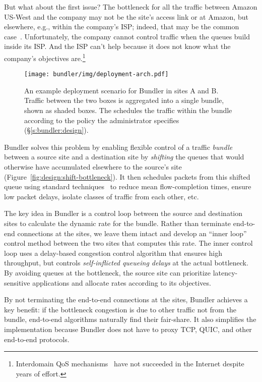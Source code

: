 But what about the first issue? The bottleneck for all the traffic between Amazon US-West and the company may not be the site's access link or at Amazon, but elsewhere, e.g., within the company's ISP; indeed, that may be the common case~\cite{inferring-interdomain-congestion, isp-throttle-1, isp-throttle-2, isp-throttle-3}. Unfortunately, the company cannot control traffic when the queues build inside its ISP. And the ISP can't help because it does not know what the company's objectives are.\footnote{Interdomain QoS mechanisms~\cite{braden1997resource, wroclawski1997use} have not succeeded in the Internet despite years of effort.}

\begin{figure}
    \centering
    \texttt{[image: bundler/img/deployment-arch.pdf]}
    \caption{An example deployment scenario for Bundler in sites A and B.
    Traffic between the two boxes is aggregated into a single bundle, shown as shaded boxes. The \inbox schedules the traffic within the bundle according to the policy the administrator specifies (\S\ref{s:bundler:design}).
    }
    \label{fig:deploy:arch}
\end{figure}


Bundler solves this problem by enabling flexible control of a traffic {\em bundle} between a source site and a destination site by {\em shifting} the queues that would otherwise have accumulated elsewhere to the source's site (Figure~\ref{fig:design:shift-bottleneck}). It then schedules packets from this shifted queue using standard techniques~\cite{diffserv, fair-queueing, sfq, pie, CoDel, fifoplus, virtualClocks, csfq, drr, red, ecn} to reduce mean flow-completion times, ensure low packet delays, isolate classes of traffic from each other, etc.

The key idea in Bundler is a control loop between the source and destination sites to calculate the dynamic rate for the bundle. Rather than terminate end-to-end connections at the sites, we leave them intact and develop an ``inner loop'' control method between the two sites that computes this rate. The inner control loop uses a delay-based congestion control algorithm that ensures high throughput, but controls {\em self-inflicted queueing delays} at the actual bottleneck. By avoiding queues at the bottleneck, the source site can prioritize latency-sensitive applications and allocate rates according to its objectives.

By not terminating the end-to-end connections at the sites, Bundler achieves a key benefit: if the bottleneck congestion is due to other traffic not from the bundle, end-to-end algorithms naturally find their fair-share. It also simplifies the implementation because Bundler does not have to proxy TCP, QUIC, and other end-to-end protocols.

